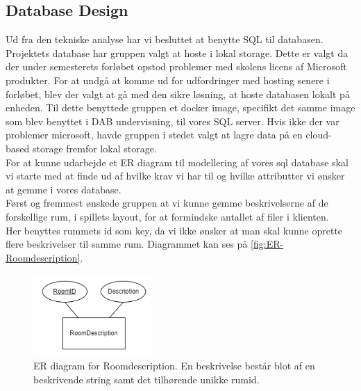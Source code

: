 \subsection{Database Design}
\label{ssec:DB Design}
Ud fra den tekniske analyse \parencite[][Section 8]{TekniskBilag} har vi besluttet at benytte SQL til databasen. 
Projektets database har gruppen valgt at hoste i lokal storage. Dette er valgt da der under semesterets forløbet opstod problemer med skolens licens af Microsoft produkter. For at undgå at komme ud for udfordringer med hosting senere i forløbet, blev der valgt at gå med den sikre løsning, at hoste databasen lokalt på enheden. Til dette benyttede gruppen et docker image\cite{SQL-server-with-docker}, specifikt det samme image som blev benyttet i DAB undervisning, til vores SQL server.
Hvis ikke der var problemer microsoft, havde gruppen i stedet valgt at lagre data på en cloud-based storage fremfor lokal storage.\\

\noindent For at kunne udarbejde et ER diagram til modellering af vores sql database skal vi starte med at finde ud af hvilke krav vi har til og hvilke attributter vi ønsker at gemme i vores database.\\
Først og fremmest ønskede gruppen at vi kunne gemme beskrivelserne af de forskellige rum, i spillets layout, for at formindske antallet af filer i klienten.\\ 
Her benyttes rummets id som key, da vi ikke ønsker at man skal kunne oprette flere beskrivelser til samme rum. Diagrammet kan ses på \autoref{fig:ER-Roomdescription}.

\begin{figure}[H]
\centering
\includegraphics[width = 0.4\textwidth]{02-Body/Images/ER-RoomDescription.PNG}
\caption{ER diagram for Roomdescription. En beskrivelse består blot af en beskrivende string samt det tilhørende unikke rumid.}
\label{fig:ER-Roomdescription}
\end{figure}

